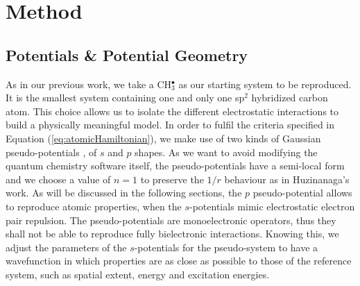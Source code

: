 \documentclass[journal=jctcce,manuscript=article]{achemso}
\begin{document}
\section{Method}

\subsection{Potentials \& Potential Geometry}

As in our previous work\cite{drujon_pseudopotentials_2013},
we take a CH\(^{\bullet}_{3}\) as our starting system to be reproduced.
It is the smallest system containing one and only one sp$^2$ hybridized carbon atom.
This choice allows us to isolate the different electrostatic interactions
to build a physically meaningful model.
In order to fulfil the criteria specified in Equation (\ref{eq:atomicHamiltonian}),
we make use of two kinds of Gaussian pseudo-potentials \cite{me_structure_theory}, of \(s\) and \(p\) shapes. As we want to avoid modifying the quantum chemistry software itself, the pseudo-potentials have a semi-local form and we choose a value of \(n = 1\) to preserve the \(1/r\) behaviour as in Huzinanaga's work. As will be discussed in the following sections,
the \(p\) pseudo-potential allows to reproduce atomic properties, when the
\(s\)-potentials mimic electrostatic electron pair repulsion. The pseudo-potentials are monoelectronic operators, thus they shall not be able to reproduce fully bielectronic interactions. Knowing this, we adjust the parameters of the \(s\)-potentials for the pseudo-system to have a wavefunction in which properties are as close as possible to those of the reference system, such as spatial extent, energy and excitation energies.
\end{document}
